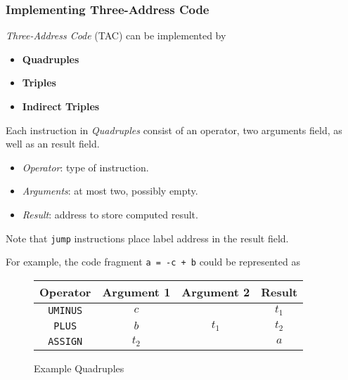 \subsubsection{Implementing Three-Address Code}

\begin{definition}
    \textit{Three-Address Code} (TAC) can be implemented by
    \begin{itemize}
        \item \textbf{Quadruples}
        \item \textbf{Triples}
        \item \textbf{Indirect Triples}
    \end{itemize}
\end{definition}

\begin{definition}[Quadruples]
    Each instruction in \textit{Quadruples} consist of an operator, two arguments field, as well as an result field.
    \begin{itemize}
        \item \textit{Operator}: type of instruction.
        \item \textit{Arguments}: at most two, possibly empty.
        \item \textit{Result}: address to store computed result.
    \end{itemize}
    
    Note that \texttt{jump} instructions place label address in the result field.
    
    For example, the code fragment \texttt{a = -c + b} could be represented as
    \begin{figure}[H]
        \centering
        \begin{tabular}{@{} c c c c @{}}
            \toprule
            Operator & Argument 1 & Argument 2 & Result \\
            \midrule
            \texttt{UMINUS} & $c$   &       & $t_1$ \\
            \texttt{PLUS}   & $b$   & $t_1$ & $t_2$ \\
            \texttt{ASSIGN} & $t_2$ &       & $a$ \\
            \bottomrule
        \end{tabular}
        \caption{Example Quadruples}
        \label{fig:example-quadruples}
    \end{figure}
\end{definition}

